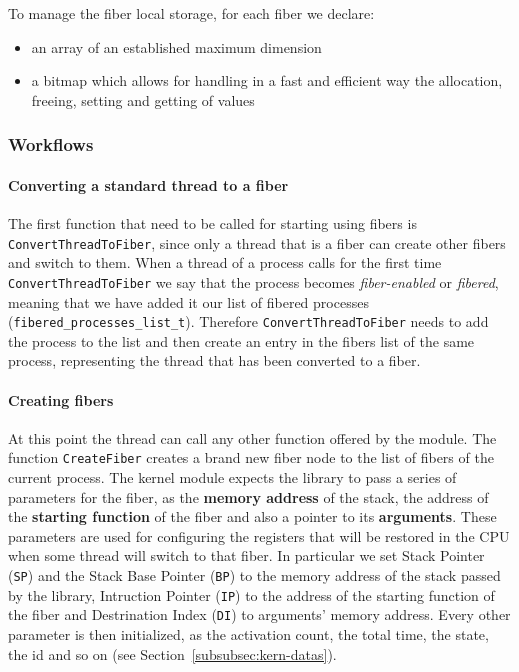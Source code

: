 \documentclass[a4paper,10pt]{article}
\begin{document}
To manage the fiber local storage, for each fiber we declare:
\begin{itemize}
	\item an array of an established maximum dimension
	\item a bitmap which allows for handling in a fast and efficient way the allocation, freeing, setting and getting of values
\end{itemize}

\subsubsection{Workflows}
\paragraph{Converting a standard thread to a fiber}
The first function that need to be called for starting using fibers is \lstinline{ConvertThreadToFiber}, since only a thread that is a fiber can create other fibers and switch to them. When a thread of a process calls for the first time \lstinline{ConvertThreadToFiber} we say that the process becomes \textit{fiber-enabled} or \textit{fibered}, meaning that we have added it our list of fibered processes (\lstinline{fibered_processes_list_t}). Therefore \lstinline{ConvertThreadToFiber} needs to add the process to the list and then create an entry in the fibers list of the same process, representing the thread that has been converted to a fiber.

\paragraph{Creating fibers}
At this point the thread can call any other function offered by the module. The function \lstinline{CreateFiber} creates a brand new fiber node to the list of fibers of the current process. The kernel module expects the library to pass a series of parameters for the fiber, as the \textbf{memory address} of the stack, the address of the \textbf{starting function} of the fiber and also a pointer to its \textbf{arguments}. These parameters are used for configuring the registers that will be restored in the CPU when some thread will switch to that fiber. In particular we set Stack Pointer (\texttt{SP}) and the Stack Base Pointer (\texttt{BP}) to the memory address of the stack passed by the library, Intruction Pointer (\texttt{IP}) to the address of the starting function of the fiber and Destrination Index (\texttt{DI}) to arguments’ memory address. Every other parameter is then initialized, as the activation count, the total time, the state, the id and so on (see Section~\ref{subsubsec:kern-datas}).
\end{document}
